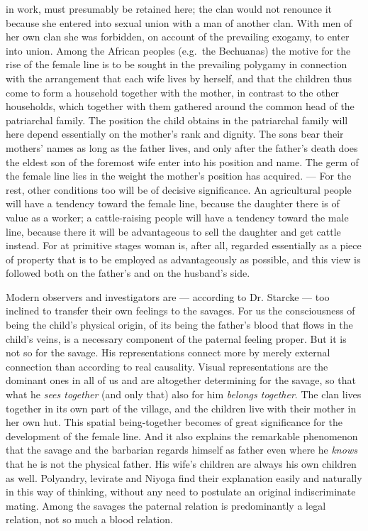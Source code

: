 \documentclass[12pt,a4paper,openany]{book}
\newcommand{\opage}[1]{\marginnote{\footnotesize\textit{[#1]}}}
\begin{document}
in work, must presumably be retained here; the clan would not
renounce it because she entered into sexual union with a man
of another clan. With men of her own clan she was
forbidden, on account of the prevailing exogamy, to enter into
union. Among the African peoples (e.g.\ the Bechuanas)
the motive for the rise of the female line is to be sought in the prevailing
polygamy in connection with the arrangement that each wife lives by
herself, and that the children thus come to form a household
together with the mother, in contrast to the other households, which
together with them gathered around the common head of the patriarchal family.
The position the child obtains in the patriarchal family will here
depend essentially on the mother's rank and dignity. The sons
bear their mothers' names as long as the father lives, and only
after the father's death does the eldest son of the foremost wife enter
into his position and name. The germ of the female line lies in the weight
the mother's position has acquired. --- For the rest, other conditions too will
be of decisive significance. An agricultural people will have
a tendency toward the female line, because the daughter there is of value as a
worker; a cattle-raising people will have a tendency toward the male line,
because there it will be advantageous to sell the daughter and get cattle
instead. For at primitive stages woman is, after all, regarded essentially as
a piece of property that is to be employed as advantageously as possible,
and this view is followed both on the father's and on the husband's
side.

Modern observers and investigators are --- according to Dr. Starcke
--- too inclined to transfer their own feelings to the savages. For
us the consciousness of being the child's physical origin, of its
being the father's blood that flows in the child's veins, is a necessary
component of the paternal feeling proper. But it is not so
for the savage. His representations connect more by merely
external connection than according to real causality. Visual representations
are the dominant ones in all of us and are altogether determining for the
savage, so that what he \emph{sees together} (and only that) also for
him \emph{belongs together}. The clan lives together in its own part of
the village, and the children live with their mother in her own
hut. This spatial being-together becomes of great significance for
\opage{792}the development of the female line. And it also explains the remarkable
phenomenon that the savage and the barbarian regards himself as father
even where he \emph{knows} that he is not the physical father. His
wife's children are always his own children as well. Polyandry, levirate
and Niyoga find their explanation easily and naturally in this way of thinking,
without any need to postulate an original indiscriminate
mating. Among the savages the paternal relation is predominantly a legal relation,
not so much a blood relation.
\end{document}
